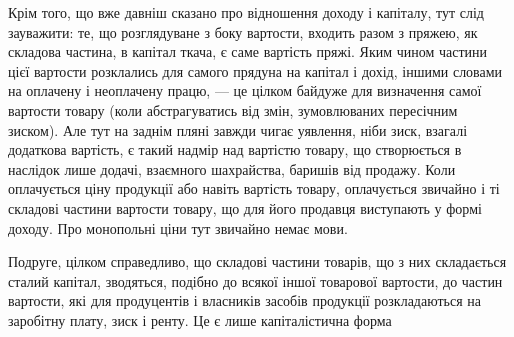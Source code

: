 Крім того, що вже давніш сказано про відношення доходу і капіталу,
тут слід зауважити: те, що розглядуване з боку вартости, входить разом з пряжею,
як складова частина, в капітал ткача, є саме вартість пряжі. Яким чином
частини цієї вартости розклались для самого прядуна на капітал і дохід, іншими
словами на оплачену і неоплачену працю, — це цілком байдуже для визначення
самої вартости товару (коли абстрагуватись від змін, зумовлюваних пересічним
зиском). Але тут на заднім пляні завжди чигає уявлення, ніби зиск, взагалі
додаткова вартість, є такий надмір над вартістю товару, що створюється в наслідок
лише додачі, взаємного шахрайства, баришів від продажу. Коли оплачується
ціну продукції або навіть вартість товару, оплачується звичайно і ті
складові частини вартости товару, що для його продавця виступають у формі
доходу. Про монопольні ціни тут звичайно немає мови.

Подруге, цілком справедливо, що складові частини товарів, що з них складається
сталий капітал, зводяться, подібно до всякої іншої товарової вартости,
до частин вартости, які для продуцентів і власників засобів продукції розкладаються
на заробітну плату, зиск і ренту. Це є лише капіталістична форма
\parbreak{}  %

